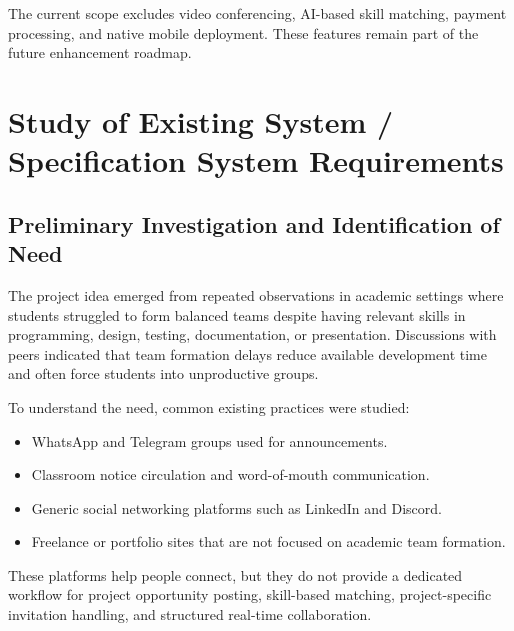 \documentclass[12pt,a4paper,oneside]{report}
\begin{document}
The current scope excludes video conferencing, AI-based skill matching, payment processing, and native mobile deployment. These features remain part of the future enhancement roadmap.

\chapter{Study of Existing System / Specification System Requirements}

\section{Preliminary Investigation and Identification of Need}
The project idea emerged from repeated observations in academic settings where students struggled to form balanced teams despite having relevant skills in programming, design, testing, documentation, or presentation. Discussions with peers indicated that team formation delays reduce available development time and often force students into unproductive groups.

To understand the need, common existing practices were studied:
\begin{itemize}
  \item WhatsApp and Telegram groups used for announcements.
  \item Classroom notice circulation and word-of-mouth communication.
  \item Generic social networking platforms such as LinkedIn and Discord.
  \item Freelance or portfolio sites that are not focused on academic team formation.
\end{itemize}

These platforms help people connect, but they do not provide a dedicated workflow for project opportunity posting, skill-based matching, project-specific invitation handling, and structured real-time collaboration.
\end{document}
